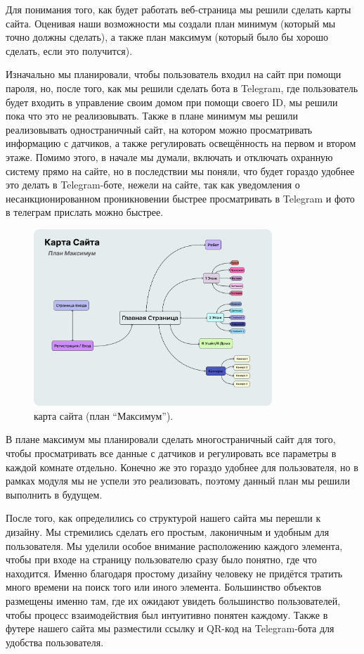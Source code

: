 Для понимания того, как будет работать веб-страница мы решили сделать карты сайта. Оценивая наши возможности мы создали план минимум (который мы точно должны сделать), а также план максимум (который было бы хорошо сделать, если это получится).

Изначально мы планировали, чтобы пользователь входил на сайт при помощи пароля, но, после того, как мы решили сделать бота в Telegram, где пользователь будет входить в управление своим домом при помощи своего ID, мы решили пока что это не реализовывать. Также в плане минимум мы решили реализовывать одностраничный сайт, на котором можно просматривать информацию с датчиков, а также регулировать освещённость  на первом и втором этаже. Помимо этого, в начале мы думали, включать и отключать охранную систему прямо на сайте, но в последствии мы поняли, что будет гораздо удобнее это делать в Telegram-боте, нежели на сайте, так как уведомления о несанкционированном проникновении быстрее просматривать в Telegram и фото в телеграм прислать можно быстрее.

\begin{figure}[h!]
	\centering
	\label{fig:img20}
	\includegraphics[width=0.8\textwidth]{./graphics/img/image20.png}
	\caption{карта сайта (план “Максимум”).}
\end{figure}

В плане максимум мы планировали сделать многостраничный сайт для того, чтобы просматривать все данные с датчиков и регулировать все параметры в каждой комнате отдельно. Конечно же это гораздо удобнее для пользователя, но в рамках модуля мы не успели это реализовать, поэтому данный план мы решили выполнить в будущем.

После того, как определились со структурой нашего сайта мы перешли к дизайну. Мы стремились сделать его простым, лаконичным и удобным для пользователя. Мы уделили особое внимание  расположению каждого элемента, чтобы при входе на страницу пользователю сразу было понятно, где что находится. Именно благодаря простому дизайну человеку не придётся тратить много времени на поиск того или иного элемента. Большинство объектов размещены именно там, где их ожидают увидеть большинство пользователей, чтобы процесс взаимодействия был интуитивно понятен каждому. Также в футере нашего сайта мы разместили ссылку и QR-код на Telegram-бота для удобства пользователя.

